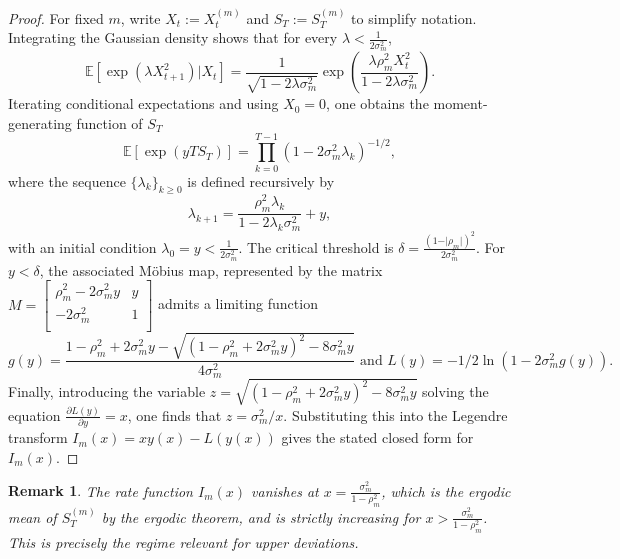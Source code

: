 \documentclass[12pt]{amsart}
\newtheorem{remark}{Remark}[section]
\numberwithin{equation}{section}
\newcommand{\E}{\mathbb{E}}
\newcommand{\1}{\mathbf{1}}
\begin{document}
\begin{proof}
For fixed $m$, write $X_t:=X_t^{(m)}$ and $S_T:=S_T^{(m)}$ to simplify notation. Integrating the Gaussian density shows that for every $\lambda<\frac{1}{2\sigma_m^2}$,
    \begin{equation*}
    \E\left[\exp\left(\lambda X^2_{t+1}\right)\vert X_{t}\right] = \frac{1}{\sqrt{1-2\lambda\sigma_m^2}}\exp\left(\frac{\lambda\rho_m^2X_t^2}{1-2\lambda\sigma_m^2}\right).
    \end{equation*}
    Iterating conditional expectations and using $X_0=0$, one obtains the moment-generating function of $S_T$
    \begin{equation*}
        \E[\exp(yTS_T)]=\prod_{k=0}^{T-1}(1-2\sigma_m^2\lambda_k)^{-1/2},
    \end{equation*}
    where the sequence $\{\lambda_k\}_{k\ge 0}$ is defined recursively by
    \begin{equation*}
        \lambda_{k+1}=\frac{\rho_m^2\lambda_k}{1-2\lambda_k\sigma_m^2} + y,
    \end{equation*}
    with an initial condition $\lambda_0=y<\frac{1}{2\sigma_m^2}$. The critical threshold is $\delta=\frac{(1-\vert \rho_m\vert)^2}{2\sigma_m^2}$. For $y<\delta$, the associated M\"obius map, represented by the matrix $M = \begin{bmatrix}
    \rho_m^2-2\sigma_m^2y & y\\
    -2\sigma_m^2 & 1\\
    \end{bmatrix}
    $
    admits a limiting function
    \[g(y)=\frac{1-\rho_m^2+2\sigma_m^2y-\sqrt{(1-\rho_m^2+2\sigma_m^2y)^2-8\sigma_m^2y}}{4\sigma_m^2} \text{ and } L(y)=-1/2\ln(1-2\sigma_m^2g(y)).\]
    Finally, introducing the variable $z=\sqrt{(1-\rho_m^2+2\sigma_m^2y)^2-8\sigma_m^2y}$ solving the equation $\frac{\partial L(y)}{\partial y}=x$, one finds that $z=\sigma_m^2/x$. Substituting this into the Legendre transform $I_m(x)=xy(x)-L(y(x))$ gives the stated closed form for $I_m(x)$.
\end{proof}
\begin{remark}
\label{ldpcond}
	The rate function $I_m(x)$ vanishes at $x = \frac{\sigma_m^2}{1-\rho_m^2}$, which is the ergodic mean of $S_T^{(m)}$ by the ergodic theorem, and is strictly increasing for $x > \frac{\sigma_m^2}{1-\rho_m^2}$. This is precisely the regime relevant for upper deviations.
\end{remark}
\end{document}
